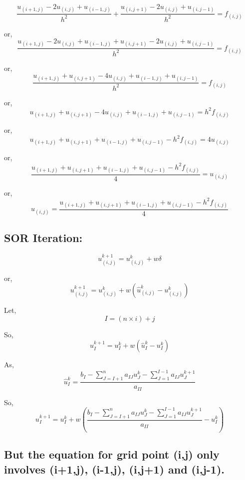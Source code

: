 \documentclass[11pt]{article}
\begin{document}
    \[\frac{u_{(i+1,j)} - 2u_{(i,j)} + u_{(i-1,j)}}{h^2 } + \frac{u_{(i,j+1)} - 2u_{(i,j)} + u_{(i,j-1)}}{h^2 } = f_{(i,j)}\]

    or,
\[\frac{u_{(i+1,j)} - 2u_{(i,j)} + u_{(i-1,j)} + u_{(i,j+1)} - 2u_{(i,j)} + u_{(i,j-1)}}{h^2 } = f_{(i,j)}\]

    or,
\[\frac{u_{(i+1,j)} + u_{(i,j+1)} - 4u_{(i,j)} + u_{(i-1,j)} + u_{(i,j-1)}}{h^2 } = f_{(i,j)}\]

    or,
\[u_{(i+1,j)} + u_{(i,j+1)} - 4u_{(i,j)} + u_{(i-1,j)} + u_{(i,j-1)} = h^2f_{(i,j)}\]

    or,
\[u_{(i+1,j)} + u_{(i,j+1)} + u_{(i-1,j)} + u_{(i,j-1)} - h^2f_{(i,j)}= 4u_{(i,j)}\]

    or,
\[\frac{u_{(i+1,j)} + u_{(i,j+1)} + u_{(i-1,j)} + u_{(i,j-1)} - h^2f_{(i,j)}}{4}= u_{(i,j)}\]

    or,
\[u_{(i,j)} = \frac{u_{(i+1,j)} + u_{(i,j+1)} + u_{(i-1,j)} + u_{(i,j-1)} - h^2f_{(i,j)}}{4}\]

    \hypertarget{sor-iteration}{%
\subsection{SOR Iteration:}\label{sor-iteration}}

    \[u^{k+1}_{(i,j)} = u^{k}_{(i,j)} + w\delta\]

    or,
\[u^{k+1}_{(i,j)} = u^{k}_{(i,j)} + w(\hat{u}^{k}_{(i,j)} - u^{k}_{(i,j)})\]

    Let, \[I = (n \times i) + j\]

    So, \[u^{k+1}_{I} = u^{k}_{I} + w(\hat{u}^{k}_{I} - u^{k}_{I})\]

    As,
\[\hat{u}^{k}_{I} = \frac{b_I - \displaystyle \sum^{n}_{J=I+1} a_{IJ}u^k_{J} - \displaystyle \sum^{I-1}_{J=1} a_{IJ}u^{k+1}_{J}}{a_{II}}\]

    So,
\[u^{k+1}_{I} = u^{k}_{I} + w \left(\frac{b_I - \displaystyle \sum^{n}_{J=I+1} a_{IJ}u^k_{J} - \displaystyle \sum^{I-1}_{J=1} a_{IJ}u^{k+1}_{J}}{a_{II}} - u^{k}_{I}\right)\]

    \hypertarget{but-the-equation-for-grid-point-ij-only-involves-i1j-i-1j-ij1-and-ij-1.}{%
\subsection{But the equation for grid point (i,j) only involves (i+1,j),
(i-1,j), (i,j+1) and
(i,j-1).}\label{but-the-equation-for-grid-point-ij-only-involves-i1j-i-1j-ij1-and-ij-1.}}
\end{document}
